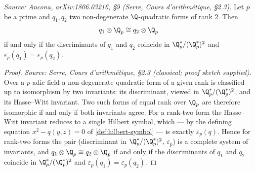 \begin{proposition}
  \label{prop:local-invariant}
  \textit{Source: Ancona, arXiv:1806.03216, §9 (Serre, \emph{Cours d'arithmétique}, §2.3).}
  Let \(p\) be a prime and \(q_1, q_2\) two non-degenerate \(\Q\)-quadratic
  forms of rank \(2\). Then
  \[q_1 \otimes \Q_p \cong q_2 \otimes \Q_p\]
  if and only if the discriminants of \(q_1\) and \(q_2\) coincide in
  \(\Q_p^*/(\Q_p^*)^2\) and \(\varepsilon_p(q_1) = \varepsilon_p(q_2)\).
\end{proposition}

\begin{proof}
  \textit{Source: Serre, Cours d'arithmétique, §2.3 (classical; proof sketch
  supplied).}
  Over a \(p\)-adic field a non-degenerate quadratic form of a given rank is
  classified up to isomorphism by two invariants: its discriminant, viewed in
  \(\Q_p^*/(\Q_p^*)^2\), and its Hasse--Witt invariant. Two such forms of equal
  rank over \(\Q_p\) are therefore isomorphic if and only if both invariants
  agree. For a rank-two form the Hasse--Witt invariant reduces to a single
  Hilbert symbol, which — by the defining equation \(x^2 - q(y,z) = 0\) of
  \cref{def:hilbert-symbol} — is exactly \(\varepsilon_p(q)\). Hence for
  rank-two forms the pair (discriminant in \(\Q_p^*/(\Q_p^*)^2\),
  \(\varepsilon_p\)) is a complete system of invariants, and
  \(q_1 \otimes \Q_p \cong q_2 \otimes \Q_p\) if and only if the discriminants
  of \(q_1\) and \(q_2\) coincide in \(\Q_p^*/(\Q_p^*)^2\) and
  \(\varepsilon_p(q_1) = \varepsilon_p(q_2)\).
\end{proof}

